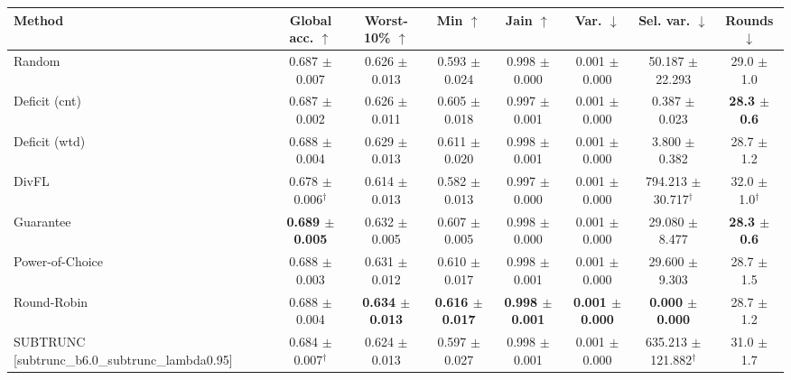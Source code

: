 \begin{tabular}{lccccccc}
\toprule
Method & Global acc. $\uparrow$ & Worst-10\% $\uparrow$ & Min $\uparrow$ & Jain $\uparrow$ & Var. $\downarrow$ & Sel. var. $\downarrow$ & Rounds $\downarrow$ \\
\midrule
Random & 0.687 $\pm$ 0.007 & 0.626 $\pm$ 0.013 & 0.593 $\pm$ 0.024 & 0.998 $\pm$ 0.000 & 0.001 $\pm$ 0.000 & 50.187 $\pm$ 22.293 & 29.0 $\pm$ 1.0 \\
Deficit (cnt) & 0.687 $\pm$ 0.002 & 0.626 $\pm$ 0.011 & 0.605 $\pm$ 0.018 & 0.997 $\pm$ 0.001 & 0.001 $\pm$ 0.000 & 0.387 $\pm$ 0.023 & \textbf{28.3 $\pm$ 0.6} \\
Deficit (wtd) & 0.688 $\pm$ 0.004 & 0.629 $\pm$ 0.013 & 0.611 $\pm$ 0.020 & 0.998 $\pm$ 0.001 & 0.001 $\pm$ 0.000 & 3.800 $\pm$ 0.382 & 28.7 $\pm$ 1.2 \\
DivFL & 0.678 $\pm$ 0.006$^\dagger$ & 0.614 $\pm$ 0.013 & 0.582 $\pm$ 0.013 & 0.997 $\pm$ 0.000 & 0.001 $\pm$ 0.000 & 794.213 $\pm$ 30.717$^\dagger$ & 32.0 $\pm$ 1.0$^\dagger$ \\
Guarantee & \textbf{0.689 $\pm$ 0.005} & 0.632 $\pm$ 0.005 & 0.607 $\pm$ 0.005 & 0.998 $\pm$ 0.000 & 0.001 $\pm$ 0.000 & 29.080 $\pm$ 8.477 & \textbf{28.3 $\pm$ 0.6} \\
Power-of-Choice & 0.688 $\pm$ 0.003 & 0.631 $\pm$ 0.012 & 0.610 $\pm$ 0.017 & 0.998 $\pm$ 0.001 & 0.001 $\pm$ 0.000 & 29.600 $\pm$ 9.303 & 28.7 $\pm$ 1.5 \\
Round-Robin & 0.688 $\pm$ 0.004 & \textbf{0.634 $\pm$ 0.013} & \textbf{0.616 $\pm$ 0.017} & \textbf{0.998 $\pm$ 0.001} & \textbf{0.001 $\pm$ 0.000} & \textbf{0.000 $\pm$ 0.000} & 28.7 $\pm$ 1.2 \\
SUBTRUNC [subtrunc\_b6.0\_subtrunc\_lambda0.95] & 0.684 $\pm$ 0.007$^\dagger$ & 0.624 $\pm$ 0.013 & 0.597 $\pm$ 0.027 & 0.998 $\pm$ 0.001 & 0.001 $\pm$ 0.000 & 635.213 $\pm$ 121.882$^\dagger$ & 31.0 $\pm$ 1.7 \\
\bottomrule
\end{tabular}

